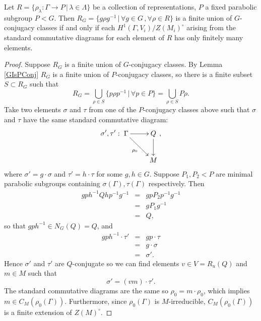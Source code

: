 \begin{lemma}\label{PConjIsHOne} Let $R=\{\rho_\lambda:\Gamma\rightarrow P\, |\, \lambda \in \Lambda\}$ be a collection of representations, $P$ a fixed parabolic subgroup $P<G$. Then $R_G = \{g\rho g^{-1}\,|\,\forall g\in G\, ,\forall\rho\in R\}$ is a finite union of $G$-conjugacy classes if and only if each $H^1(\Gamma, V_i)/Z(M_i)^\circ$ arising from the standard commutative diagrams for each element of $R$ has only finitely many elements.
\end{lemma}
\begin{proof}
	Suppose $R_G$ is a finite union of $G$-conjugacy classes. By Lemma \ref{GIsPConj} $R_G$ is a finite union of $P$-conjugacy classes, so there is a finite subset $S\subset R_G$ such that
	\begin{displaymath}
		R_G = \bigcup_{\rho \in S}\{p\rho p^{-1}\,|\,\forall p\in P\} = \bigcup_{\rho \in S}P\rho.
	\end{displaymath}
	Take two elements $\sigma$ and $\tau$ from one of the $P$-conjugacy classes above such that $\sigma$ and $\tau$ have the same standard commutative diagram:
	\begin{displaymath}
		\sigma',\tau':\xymatrix{
			\Gamma \ar[r] \ar[rd]_{\rho_0} & Q \ar[d]\\
		& M},
	\end{displaymath}
	where $\sigma' = g\cdot\sigma$ and $\tau' = h\cdot\tau$ for some $g, h\in G$. Suppose $P_1,P_2<P$ are minimal parabolic subgroups containing $\sigma(\Gamma), \tau(\Gamma)$ respectively. Then
	\begin{eqnarray*}
		gph^{-1}Qhp^{-1}g^{-1} &=& gpP_2p^{-1}g^{-1} \\
		&=& gP_1g^{-1} \\
		&=& Q,
	\end{eqnarray*}
	so that $gph^{-1}\in N_G(Q) = Q$, and
	\begin{eqnarray*}
		gph^{-1}\cdot\tau' &=& gp\cdot \tau \\
		&=& g\cdot \sigma \\
		&=& \sigma'.
	\end{eqnarray*}
	Hence $\sigma'$ and $\tau'$ are $Q$-conjugate so we can find elements $v\in V = R_u(Q)$ and $m\in M$ such that
	\begin{displaymath}
		\sigma' = (vm)\cdot\tau'.
	\end{displaymath}
	The standard commutative diagrams are the same so $\rho_0 = m\cdot\rho_0$, which implies $m\in C_M(\rho_0(\Gamma))$. Furthermore, since $\rho_0(\Gamma)$ is $M$-irreducible, $C_M(\rho_0(\Gamma))$ is a finite extension of $Z(M)^\circ$.
	

\end{proof}

